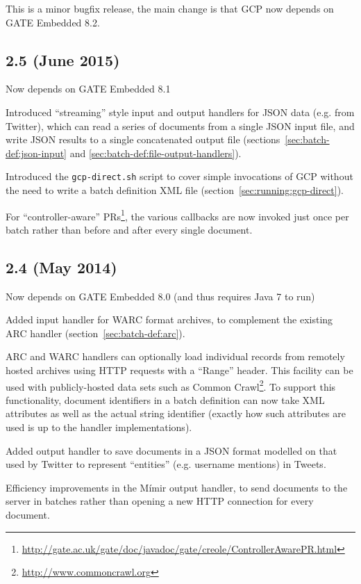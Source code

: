 This is a minor bugfix release, the main change is that GCP now depends on GATE
Embedded 8.2.

\subsection{2.5 (June 2015)}

\bit
\item Now depends on GATE Embedded 8.1
\item Introduced ``streaming'' style input and output handlers for JSON
  data (e.g. from Twitter), which can read a series of documents from
  a single JSON input file, and write JSON results to a single concatenated
  output file (sections~\ref{sec:batch-def:json-input} and
  \ref{sec:batch-def:file-output-handlers}).
\item Introduced the \verb!gcp-direct.sh! script to cover simple invocations
  of GCP without the need to write a batch definition XML file
  (section~\ref{sec:running:gcp-direct}).
\item For ``controller-aware''
  PRs\footnote{\url{http://gate.ac.uk/gate/doc/javadoc/gate/creole/ControllerAwarePR.html}},
  the various callbacks are now invoked just once per batch rather than before
  and after every single document.
\eit

\subsection{2.4 (May 2014)}

\bit
\item Now depends on GATE Embedded 8.0 (and thus requires Java 7 to run)
\item Added input handler for WARC format archives, to complement the existing
  ARC handler (section~\ref{sec:batch-def:arc}).
\item ARC and WARC handlers can optionally load individual records from
  remotely hosted archives using HTTP requests with a ``Range'' header.  This
  facility can be used with publicly-hosted data sets such as Common
  Crawl\footnote{\url{http://www.commoncrawl.org}}.  To support this
  functionality, document identifiers in a batch definition can now take XML
  attributes as well as the actual string identifier (exactly how such
  attributes are used is up to the handler implementations).
\item Added output handler to save documents in a JSON format modelled on that
  used by Twitter to represent ``entities'' (e.g. username mentions) in Tweets.
\item Efficiency improvements in the M\'{i}mir output handler, to send
  documents to the server in batches rather than opening a new HTTP connection
  for every document.
\eit

